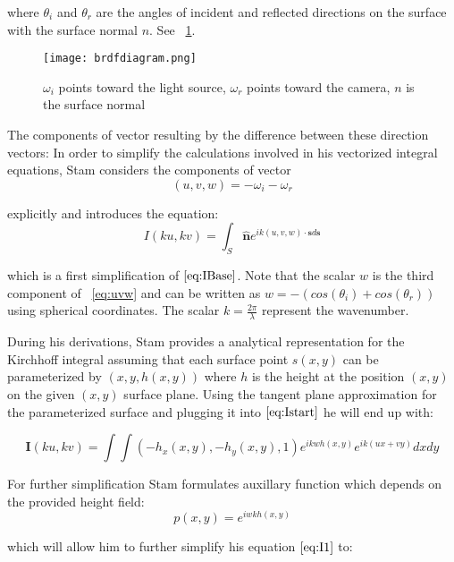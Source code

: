 where $\theta_i$ and $\theta_r$ are the angles of incident and reflected directions on the surface with the surface normal $n$. See ~\ref{fig:geometricsetup}.

\begin{figure}[ht]
  \centering
  \texttt{[image: brdfdiagram.png]}
  \caption{$\omega_i$ points toward the light source, $\omega_r$ points toward the camera, $n$ is the surface normal}
  \label{fig:geometricsetup}  
\end{figure}

The components of vector resulting by the difference between these direction vectors:
In order to simplify the calculations involved in his vectorized integral equations, Stam considers the components of vector 
\begin{equation}
  (u,v,w) = -\omega_i - \omega_r 
\label{eq:uvw}
\end{equation}

explicitly and introduces the equation: 
\begin{equation}
  I(ku,kv) = \int_{S} \hat{\mathbf{n}} e^{ik(u,v,w) \cdot \mathbf{s} d\mathbf{s}} 
\label{eq:Istart}
\end{equation}

which is a first simplification of $\ref{eq:IBase}$. Note that the scalar $w$ is the third component of ~\ref{eq:uvw} and can be written as $w = -(cos(\theta_i)+cos(\theta_r))$ using spherical coordinates. The scalar $k=\frac{2\pi}{\lambda}$ represent the wavenumber.


During his derivations, Stam provides a analytical representation for the Kirchhoff integral assuming that each surface point $s(x,y)$ can be parameterized by $(x,y,h(x,y))$ where $h$ is the height at the position $(x,y)$ on the given $(x,y)$ surface plane. Using the tangent plane approximation for the parameterized surface and plugging it into $\ref{eq:Istart}$ he will end up with: 

\begin{equation}
    \mathbf{I}(ku, kv) = \int \int (-h_{x}(x,y), -h_{y}(x,y), 1) e^{ikwh(x,y)} e^{ik(ux + vy)} dx dy
\label{eq:I1}
\end{equation}

For further simplification Stam formulates auxillary function which depends on the provided height field: 
\begin{equation}
  p(x,y) = e^{iwkh(x,y)} 
\label{eq:px}
\end{equation}

which will allow him to further simplify his equation $\ref{eq:I1}$ to:

